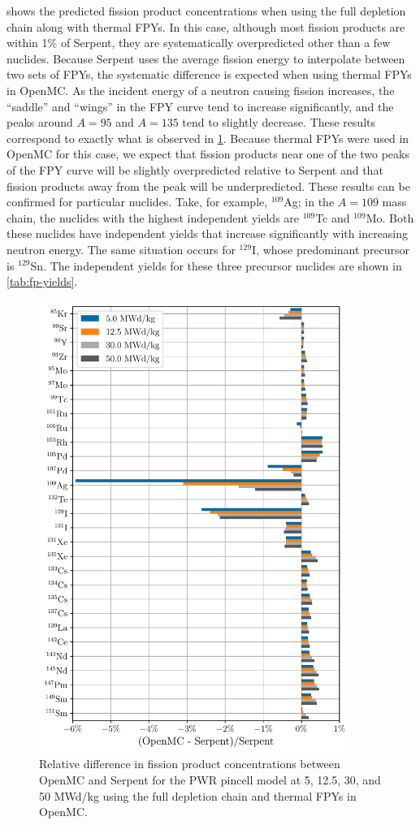 \documentclass[3p,authoryear]{elsarticle}
\begin{document}
 shows the predicted fission product
concentrations when using the full depletion chain along with thermal FPYs. In
this case, although most fission products are within 1\% of Serpent, they are
systematically overpredicted other than a few nuclides. Because Serpent uses the
average fission energy to interpolate between two sets of FPYs, the systematic
difference is expected when using thermal FPYs in OpenMC. As the incident energy
of a neutron causing fission increases, the ``saddle'' and ``wings'' in the FPY
curve tend to increase significantly, and the peaks around $A=95$ and $A=135$
tend to slightly decrease. These results correspond to exactly what is observed
in \cref{fig:pwr-fp-full-thermal}. Because thermal FPYs were used in OpenMC for
this case, we expect that fission products near one of the two peaks of the FPY
curve will be slightly overpredicted relative to Serpent and that fission
products away from the peak will be underpredicted. These results can be
confirmed for particular nuclides. Take, for example, $^{109}$Ag; in the $A=109$
mass chain, the nuclides with the highest independent yields are $^{109}$Tc and
$^{109}$Mo. Both these nuclides have independent yields that increase
significantly with increasing neutron energy. The same situation occurs for
$^{129}$I, whose predominant precursor is $^{129}$Sn. The independent yields for
these three precursor nuclides are shown in \cref{tab:fp-yields}.
\begin{figure}[H]
  \centering
  \includegraphics[width=4in]{figures/pwr_fp_full_thermal.pdf}
  \caption{Relative difference in fission product concentrations between OpenMC
  and Serpent for the PWR pincell model at 5, 12.5, 30, and 50 MWd/kg using the
  full depletion chain and thermal FPYs in OpenMC.}
  \label{fig:pwr-fp-full-thermal}
\end{figure}
\end{document}

